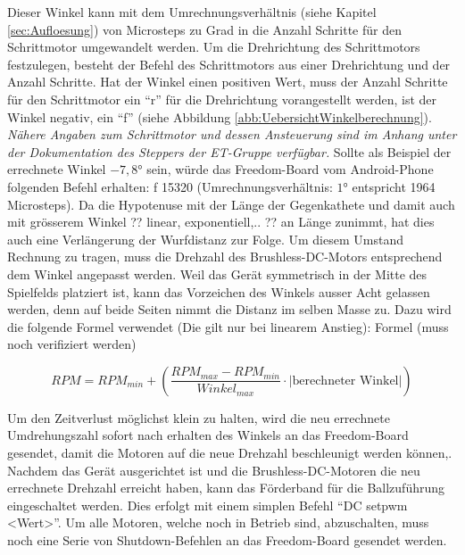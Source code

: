 Dieser Winkel kann mit dem Umrechnungsverhältnis (siehe Kapitel \ref{sec:Aufloesung}) von Microsteps zu Grad 
in die Anzahl Schritte für den Schrittmotor umgewandelt werden. Um die Drehrichtung des Schrittmotors festzulegen, besteht der 
Befehl des Schrittmotors aus einer Drehrichtung und der Anzahl Schritte. Hat der Winkel einen positiven Wert, muss der Anzahl 
Schritte für den Schrittmotor ein  \enquote{r} für die Drehrichtung vorangestellt werden, ist der Winkel negativ, ein  \enquote{f} 
(siehe Abbildung \ref{abb:UebersichtWinkelberechnung}).  
\newline
\newline
\textit{Nähere Angaben zum Schrittmotor und dessen Ansteuerung sind im Anhang unter der Dokumentation des Steppers der ET-Gruppe verfügbar.}
\newline
\newline
Sollte als Beispiel der errechnete Winkel $-7,8\si{\degree}$ sein, würde das Freedom-Board vom Android-Phone folgenden 
Befehl erhalten: f 15320 (Umrechnungsverhältnis: $1\si{\degree}$ entspricht 1964 Microsteps).
\newline
Da die Hypotenuse mit der Länge der Gegenkathete und damit auch mit grösserem Winkel ?? linear, exponentiell,.. ?? an Länge zunimmt, 
hat dies auch eine Verlängerung der Wurfdistanz zur Folge. Um diesem Umstand Rechnung zu tragen, muss die Drehzahl des 
Brushless-DC-Motors entsprechend dem Winkel angepasst werden. Weil das Gerät symmetrisch in der Mitte des Spielfelds platziert ist, 
kann das Vorzeichen des Winkels ausser Acht gelassen werden, denn auf beide Seiten nimmt die Distanz im selben Masse zu.
Dazu wird die folgende Formel verwendet (Die gilt nur bei linearem Anstieg):
\newline
\newline
Formel (muss noch verifiziert werden)
 
\begin{equation}
RPM = RPM_{min} +  \left( \frac{RPM_{max} -RPM_{min}}{Winkel_{max}} \cdot |\text{berechneter Winkel}| \right)
\end{equation}
 
Um den Zeitverlust möglichst klein zu halten, wird die neu errechnete Umdrehungszahl sofort nach erhalten des Winkels an das 
Freedom-Board gesendet, damit die Motoren auf die neue Drehzahl beschleunigt werden können,.
Nachdem das Gerät ausgerichtet ist und die Brushless-DC-Motoren die neu errechnete Drehzahl erreicht haben, kann das Förderband 
für die Ballzuführung eingeschaltet werden. Dies erfolgt mit einem simplen Befehl \enquote{DC setpwm <Wert>}. 
Um alle Motoren, welche noch in Betrieb sind, abzuschalten, muss noch eine Serie von Shutdown-Befehlen an das 
Freedom-Board gesendet werden. 


            
            

